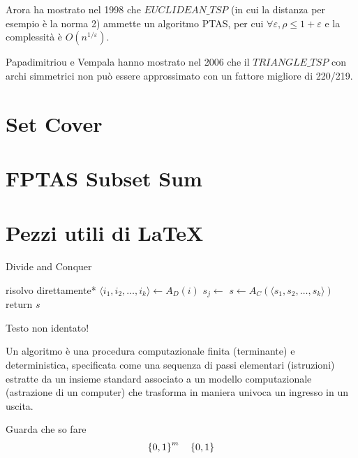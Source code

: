 Arora ha mostrato nel 1998 \cite{Arora:1998:PTA:290179.290180} che $EUCLIDEAN\_TSP$ (in cui la distanza per esempio è la norma 2) ammette un algoritmo PTAS,
per cui
$
\forall \varepsilon,
\rho \leq 1+\varepsilon
$
e la complessità è $
O \left( n^{1/\varepsilon} \right)
$.

Papadimitriou e Vempala hanno mostrato nel 2006 \cite{Papadimitriou:2006:s00493-006-0008-z} che il $TRIANGLE\_TSP$ con archi simmetrici non può essere approssimato con un fattore migliore di 220/219.

\section{Set Cover}

\section{FPTAS Subset Sum}

\section{Pezzi utili di \LaTeX{}}
\begin{algorithm}[H]
\caption{Divide and Conquer}\label{alg:dnc}
\begin{algorithmic}[1]
            \State *risolvo direttamente*
        \EndIf
        \State $\langle i_1, i_2, \dots, i_k \rangle \gets A_D(i)$ 
            \State $s_j \gets $ 
        \EndFor
        \State $s \gets A_C(\langle s_1, s_2, \dots, s_k \rangle)$
        \State return $s$
    \EndProcedure
\end{algorithmic}
\end{algorithm}
\noindent
Testo non identato!

\begin{definition}[Algoritmo]\label{def:algex}
    Un algoritmo è una procedura computazionale finita (terminante) e deterministica, specificata come una sequenza di passi elementari (istruzioni) estratte da un insieme standard associato a un modello computazionale (astrazione di un computer) che trasforma in maniera univoca un ingresso in un uscita.
\end{definition}

Guarda che so fare
\begin{equation*}
    \left\{0,1\right\}^{m}
    \quad
    \left\{0,1\right\}^{}
\end{equation*}

